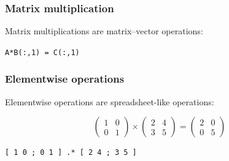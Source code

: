 \documentclass[11pt]{beamer}
\begin{document}
\begin{frame}[fragile]
  \frametitle{Matrix multiplication}
  \Enlarge
   \pause
  \begin{enumerate}
     \myitem  Matrix multiplications are matrix--vector operations: \pause
     	\begin{enumerate}
	\mysubitem \texttt{A*B(:,1) = C(:,1)}
	\end{enumerate}
  \end{enumerate}
\end{frame}

\begin{frame}[fragile]
  \frametitle{Elementwise operations}
  \Enlarge

  \begin{enumerate}
  \myitem  Elementwise operations are spreadsheet-like operations:
  \end{enumerate}
  $$
\left( \begin{array}{cc}
  1 & 0 \\
  0 & 1
\end{array} \right)
\times
\left( \begin{array}{cc}
  2 & 4 \\
  3 & 5
\end{array} \right)
=
\left( \begin{array}{cc}
  2 & 0 \\
  0 & 5
\end{array} \right)
  $$
  \pause
  \begin{Verbatim}
[ 1 0 ; 0 1 ] .* [ 2 4 ; 3 5 ]
  \end{Verbatim}
\end{frame}
\end{document}
